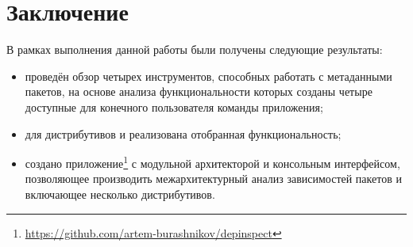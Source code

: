 
\section*{Заключение}
В рамках выполнения данной работы были получены следующие результаты:

\begin{itemize}
	\item проведён обзор четырех инструментов, способных работать с метаданными пакетов, на основе анализа функциональности которых созданы четыре доступные для конечного пользователя команды приложения;
	\item для дистрибутивов {\ubuntu} и {\fedora} реализована отобранная функциональность;
	\item создано приложение\footnote{\href{https://github.com/artem-burashnikov/depinspect}{https://github.com/artem-burashnikov/depinspect}} с модульной архитекторой и консольным интерфейсом, позволяющее производить межархитектурный анализ зависимостей пакетов и включающее несколько дистрибутивов.
\end{itemize}
